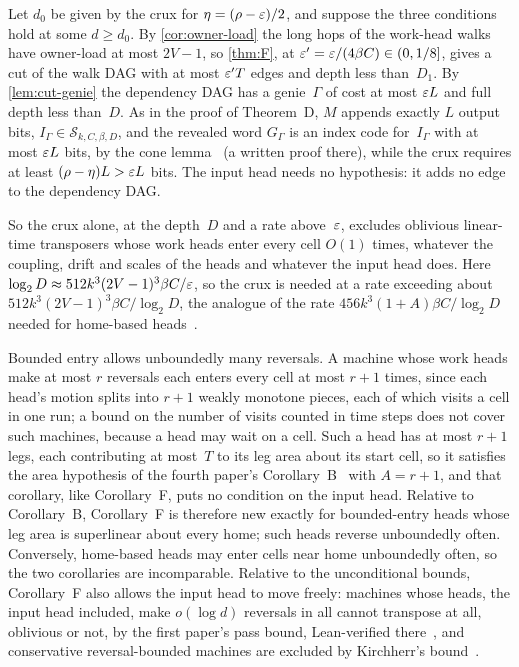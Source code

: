 \begin{informalproof}
Let $d_0$ be given by the crux for $\eta=(\rho-\varepsilon)/2$, and suppose the three conditions hold at some $d\ge d_0$. By
\cref{cor:owner-load} the long hops of the work-head walks have owner-load at most $2V-1$, so \cref{thm:F}, at
$\varepsilon'=\varepsilon/(4\beta C)\in(0,1/8]$, gives a cut of the walk DAG with at most $\varepsilon'T$ edges and depth less than~$D_1$. By
\cref{lem:cut-genie} the dependency DAG has a genie~$\Gamma$ of cost at most $\varepsilon L$ and full depth less than~$D$. As in the
proof of Theorem~D, $M$ appends exactly $L$ output bits, $I_\Gamma\in\mathcal S_{k,C,\beta,D}$, and the revealed word
$G_\Gamma$ is an index code for~$I_\Gamma$ with at most $\varepsilon L$ bits, by the cone lemma~\cite[Corollary~4.5]{FourthPaper2026}
(a written proof there), while the
crux requires at least $(\rho-\eta)L>\varepsilon L$ bits. The input head needs no hypothesis: it adds no edge to the dependency DAG.
\end{informalproof}

So the crux alone, at the depth~$D$ and a rate above~$\varepsilon$, excludes oblivious linear-time transposers whose work heads
enter every cell $O(1)$ times, whatever the coupling, drift and scales of the heads and whatever the input head does.
Here $\log_2D\approx512k^3(2V-1)^3\beta C/\varepsilon$, so the crux is needed at a rate exceeding about
$512k^3(2V-1)^3\beta C/\log_2D$, the analogue of the rate $456k^3(1+A)\beta C/\log_2D$ needed for home-based
heads~\cite[Remark~4.15]{FourthPaper2026}.

\begin{remark}\label{rem:calibration}
Bounded entry allows unboundedly many reversals. A machine whose work heads make at most $r$ reversals each enters every
cell at most $r+1$ times, since each head's motion splits into $r+1$ weakly monotone pieces, each of which visits a cell in
one run; a bound on the number of visits counted in time steps does not cover such machines, because a head may wait on a
cell. Such a head has at most $r+1$ legs, each contributing at most~$T$ to its leg area about its start cell, so it satisfies
the area hypothesis of the fourth paper's Corollary~B~\cite[Corollary~4.23]{FourthPaper2026} with $A=r+1$, and that corollary, like Corollary~F, puts no
condition on the input head. Relative to Corollary~B, Corollary~F is therefore new exactly for bounded-entry heads whose leg
area is superlinear about every home; such heads reverse unboundedly often. Conversely, home-based heads may enter cells
near home unboundedly often, so the two corollaries are incomparable. Relative to the unconditional bounds, Corollary~F
also allows the input head to move freely: machines whose heads, the input head included, make $o(\log d)$ reversals in
all cannot transpose at all, oblivious or not, by the first paper's pass bound, Lean-verified
there~\cite[Theorems~5.9 and~5.12]{FirstPaper2026}, and conservative reversal-bounded machines are excluded by Kirchherr's
bound~\cite{Kirchherr1988}.
\end{remark}

